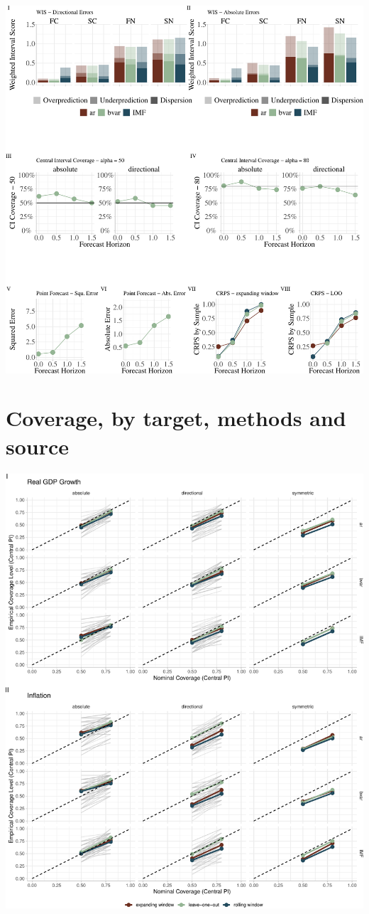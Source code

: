 \documentclass[
]{article}
\begin{document}
\includegraphics{manuscript_files/figure-latex/gdpovr-1.pdf}

\hypertarget{coverage-by-target-methods-and-source}{%
\section{Coverage, by target, methods and source}\label{coverage-by-target-methods-and-source}}

\includegraphics{manuscript_files/figure-latex/cvgplot-1.pdf}
\end{document}

